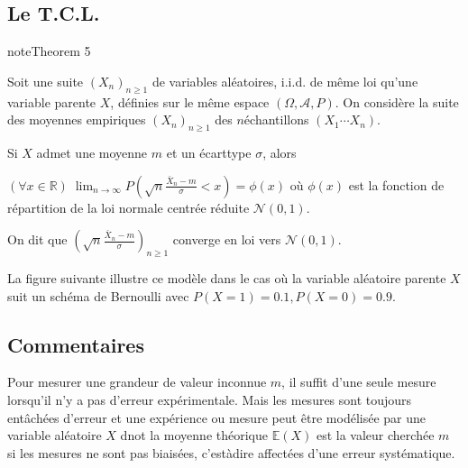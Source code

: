 \documentclass[letterpaper,10pt,english]{jupyterBook}
\begin{document}
\subsection{Le T.C.L.}
\label{\detokenize{elemstats:le-t-c-l}}\label{elemstats:theorem-9}
\begin{sphinxadmonition}{note}{Theorem 5}



\sphinxAtStartPar
Soit une suite \((X_n)_{n\geq 1}\) de variables aléatoires, i.i.d. de même loi qu’une variable parente \(X\), définies sur le même espace \((\Omega,\mathcal A,P)\). On considère la suite des moyennes empiriques \((X_n)_{n\geq 1}\) des \(n\)\sphinxhyphen{}échantillons \((X_1\cdots X_n)\).

\sphinxAtStartPar
Si \(X\) admet une moyenne \(m\) et un écart\sphinxhyphen{}type \(\sigma\), alors

\sphinxAtStartPar
\((\forall x\in\mathbb{R})\; \displaystyle\lim_{n\rightarrow\infty}P\left (\sqrt{n}\frac{\bar X_n-m}{\sigma} <x\right) = \phi(x)\)
où \( \phi(x)\) est la fonction de répartition de la loi normale centrée réduite \(\mathcal{N}(0,1)\).

\sphinxAtStartPar
On dit que \(\left (\sqrt{n}\frac{\bar X_n-m}{\sigma}\right )_{n\geq 1}\) converge en loi vers \(\mathcal{N}(0,1)\).
\end{sphinxadmonition}

\sphinxAtStartPar
La figure suivante illustre ce modèle dans le cas où la variable aléatoire parente \(X\) suit un schéma de Bernoulli avec \(P(X = 1)=0.1, P(X=0)=0.9\).

\sphinxAtStartPar
{}


\subsection{Commentaires}
\label{\detokenize{elemstats:commentaires}}
\sphinxAtStartPar
Pour mesurer une grandeur de valeur inconnue \(m\), il suffit d’une seule mesure lorsqu’il n’y a pas d’erreur expérimentale. Mais les mesures sont toujours entâchées d’erreur et une expérience ou mesure peut être modélisée par une variable aléatoire \(X\) dnot la moyenne théorique \(\mathbb{E}(X)\) est la valeur cherchée \(m\) si les mesures ne sont pas biaisées, c’est\sphinxhyphen{}à\sphinxhyphen{}dire affectées d’une erreur systématique.
\end{document}
